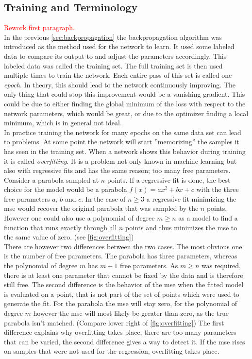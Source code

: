 \subsection{Training and Terminology}\label{sec:training}
\textcolor{red}{Rework first paragraph.}\\
In the previous \autoref{sec:backpropagation} the backpropagation algorithm was introduced as the method used for the network to learn. It used some labeled data to compare its output to and adjust the parameters accordingly. This labeled data was called the training set. The full training set is then used multiple times to train the network. Each entire pass of this set is called one \emph{epoch}. In theory, this should lead to the network continuously improving. The only thing that could stop this improvement would be a vanishing gradient. This could be due to either finding the global minimum of the loss with respect to the network parameters, which would be great, or due to the optimizer finding a local minimum, which is in general not ideal.\\
In practice training the network for many epochs on the same data set can lead to problems. At some point the network will start ''memorizing'' the samples it has seen in the training set. When a network shows this behavior during training it is called \emph{overfitting}. It is a problem not only known in machine learning but also with regressive fits and has the same reason; too many free parameters. Consider a parabola sampled at $n$ points. If a regressive fit is done, the best choice for the model would be a parabola $f(x)=a x^2+b x + c$ with the three free parameters $a$, $b$ and $c$. In the case of $n\geq 3$ a regressive fit minimizing the \gls{mse} would recover the original parabola that was sampled by the $n$ points. However one could also use a polynomial of degree $m\geq n$ as a model to find a function that runs exactly through all $n$ points and thus minimizes the \gls{mse} to the same value of zero. (see \autoref{fig:overfitting})\\
There are however two differences between the two cases. The most obvious one is the number of free parameters. The parabola has three parameters, whereas the polynomial of degree $m$ has $m+1$ free parameters. As $m\geq n$ was required, there is at least one parameter that cannot be fixed by the data and is therefore still free. The second difference is the behavior of the \gls{mse} when the fitted model is evaluated on a point, that is not part of the set of points which were used to generate the fit. For the parabola the \gls{mse} will stay zero, for the polynomial of degree $m$ however the \gls{mse} will most likely be greater than zero, as the true parabola isn't matched. (Compare lower right of \autoref{fig:overfitting}) The first difference explains why overfitting takes place, there are too many parameters that can be varied, the second difference gives a way to detect it. If the \gls{mse} rises on samples that were not used for the regression, overfitting takes place.\\
